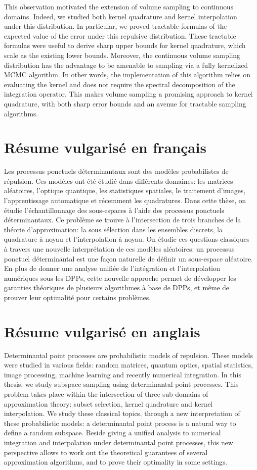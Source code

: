 \documentclass[twoside,11pt]{book}
\numberwithin{theorem}{chapter}
\numberwithin{definition}{chapter}
\numberwithin{proposition}{chapter}
\numberwithin{corollary}{chapter}
\numberwithin{example}{chapter}
\numberwithin{lemma}{chapter}
\numberwithin{assumption}{chapter}
\numberwithin{equation}{chapter}
\numberwithin{figure}{chapter}
\begin{document}
This observation motivated the extension of volume sampling to continuous domains. Indeed, we studied both kernel quadrature and kernel interpolation under this distribution. In particular, we proved tractable formulas of the expected value of the error under this repulsive distribution. These tractable formulas were useful to derive sharp upper bounds for kernel quadrature, which scale as the existing lower bounds. Moreover, the continuous volume sampling distribution has the advantage to be amenable to sampling via a fully kernelized MCMC algorithm. In other words, the implementation of this algorithm 
relies on evaluating the kernel and
does not require the spectral decomposition of the integration operator. This makes volume sampling a promising approach to kernel quadrature, with both sharp error bounds and an avenue for tractable sampling algorithms.


\section{Résume vulgarisé en français}

Les processus ponctuels déterminantaux sont des modèles probabilistes de répulsion. Ces modèles ont été étudié dans différents domaines: les matrices aléatoires, l’optique quantique, les statistiques spatiales, le traitement d’images, l’apprentissage automatique et récemment les quadratures.
Dans cette thèse, on étudie l’échantillonnage des sous-espaces à l’aide des processus ponctuels déterminantaux. Ce problème se trouve à l’intersection de trois branches de la théorie d’approximation: la sous sélection dans les ensembles discrets, la quadrature à noyau et l’interpolation à noyau. On étudie ces questions classiques à travers une nouvelle interprétation de ces modèles aléatoires: un processus ponctuel déterminantal est une façon naturelle de définir un sous-espace aléatoire. En plus de donner une analyse unifiée de l’intégration et l’interpolation numériques sous les DPPs, cette nouvelle approche permet de développer les garanties théoriques de plusieurs algorithmes à base de DPPs, et même de prouver leur optimalité pour certains problèmes.

\section{Résume vulgarisé en anglais}

Determinantal point processes are probabilistic models of repulsion.
These models were studied in various fields: random matrices, quantum optics, spatial statistics, image processing, machine learning and recently numerical integration.
In this thesis, we study subspace sampling using determinantal point processes. This problem takes place within the intersection of three sub-domains of approximation theory: subset selection, kernel quadrature and kernel interpolation. We study these classical topics, through a new interpretation of these probabilistic models: a determinantal point process is a natural way to define a random  subspace. Beside giving a unified analysis to numerical integration and interpolation under determinantal point processes, this new perspective allows to work out the theoretical guarantees of several approximation algorithms, and to prove their optimality in some settings.
\end{document}
